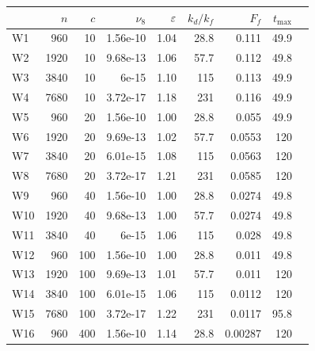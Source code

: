 \begin{table}
\begin{center}

\label{Table1}
\begin{tabular}{lrrrrrrrr}

\toprule
{} &   $n$ &  $c$ &  $\nu_8$ &  $\varepsilon$ &  $ k_{d}  / {k_f} $ &   $F_f$ &    $t_{\max}$ \\
\midrule
W1  &   960 &   10 & 1.56e-10 &        1.04 &                    28.8 &   0.111 &                49.9 \\
W2  &  1920 &   10 & 9.68e-13 &        1.06 &                    57.7 &   0.112 &               49.8 \\
W3  &  3840 &   10 &    6e-15 &         1.10&                     115 &   0.113 &               49.9 \\
W4  &  7680 &   10 & 3.72e-17 &        1.18 &                     231 &   0.116 &               49.9 \\
W5  &   960 &   20 & 1.56e-10 &           1.00 &                    28.8 &   0.055 &              49.9 \\
W6  &  1920 &   20 & 9.69e-13 &        1.02 &                    57.7 &  0.0553 &                120 \\
W7  &  3840 &   20 & 6.01e-15 &        1.08 &                     115 &  0.0563 &                120 \\
W8  &  7680 &   20 & 3.72e-17 &        1.21 &                     231 &  0.0585 &                 120 \\
W9  &   960 &   40 & 1.56e-10 &          1.00 &                    28.8 &  0.0274 &                49.8 \\
W10 &  1920 &   40 & 9.68e-13 &       1.00 &                    57.7 &  0.0274 &               49.8 \\
W11 &  3840 &   40 &    6e-15 &        1.06 &                     115 &   0.028 &               49.8 \\
W12 &   960 &  100 & 1.56e-10 &       1.00 &                    28.8 &   0.011 &                49.8 \\
W13 &  1920 &  100 & 9.69e-13 &        1.01 &                    57.7 &   0.011 &                 120 \\
W14 &  3840 &  100 & 6.01e-15 &        1.06 &                     115 &  0.0112 &                 120 \\
W15 &  7680 &  100 & 3.72e-17 &        1.22 &                     231 &  0.0117 &                95.8 \\
W16 &   960 &  400 & 1.56e-10 &        1.14 &                    28.8 & 0.00287 &                 120 \\

\end{tabular}
\end{center}
\end{table}

